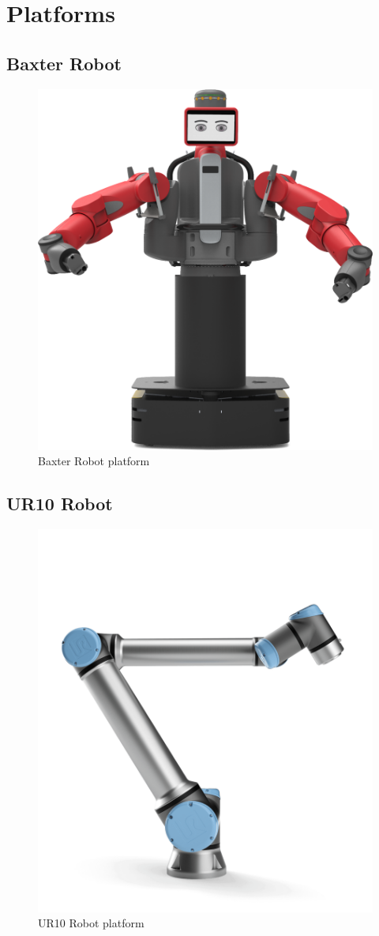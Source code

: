 \chapter{Platforms}
\label{chap:platforms}
\section{Baxter Robot}
\begin{figure}
	\centering
	\includegraphics[width=0.5\linewidth]{Images/baxter.png}
	\caption{Baxter Robot platform}
	\label{fig:baxter}
\end{figure}

\section{UR10 Robot}
\begin{figure}
	\centering
	\includegraphics[width=0.5\linewidth]{Images/ur10.png}
	\caption{UR10 Robot platform}
	\label{fig:ur10}
\end{figure}

